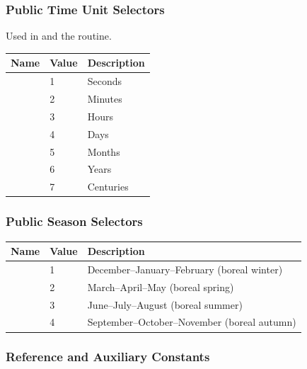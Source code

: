 \subsubsection{Public Time Unit Selectors}

Used in  and the  routine.

\begin{longtable}{L{3cm} L{2cm} L{9cm}}
  \toprule
  \textbf{Name} & \textbf{Value} & \textbf{Description} \\
  \midrule
  \endhead
  \bottomrule
  \endfoot
   & 1 & Seconds \\
   & 2 & Minutes \\
   & 3 & Hours \\
   & 4 & Days \\
   & 5 & Months \\
   & 6 & Years \\
   & 7 & Centuries \\
\end{longtable}

\subsubsection{Public Season Selectors}

\begin{longtable}{L{3.5cm} L{2cm} L{8.5cm}}
  \toprule
  \textbf{Name} & \textbf{Value} & \textbf{Description} \\
  \midrule
  \endhead
  \bottomrule
  \endfoot
   & 1 & December--January--February (boreal winter) \\
   & 2 & March--April--May (boreal spring) \\
   & 3 & June--July--August (boreal summer) \\
   & 4 & September--October--November (boreal autumn) \\
\end{longtable}

\subsubsection{Reference and Auxiliary Constants}


